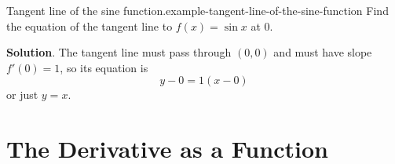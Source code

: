 \documentclass[10pt,]{book}
\numberwithin{equation}{section}
\begin{document}
\begin{example}{Tangent line of the sine function.}{example-tangent-line-of-the-sine-function}%
\hypertarget{p-98}{}%
Find the equation of the tangent line to \(f(x) = \sin x\) at \(0\).%
\par\smallskip%
\noindent\textbf{Solution}.\hypertarget{solution-21}{}\quad%
\hypertarget{p-99}{}%
The tangent line must pass through \((0,0)\) and must have slope \(f'(0) = 1\), so its equation is%
\begin{equation*}
y-0 = 1(x-0)
\end{equation*}
or just \(y=x\).%
\end{example}
%
%
\typeout{************************************************}
\typeout{************************************************}
%
\section[{The Derivative as a Function}]{The Derivative as a Function}\label{section-the-derivative-as-a-function}
%
%
\typeout{************************************************}
\typeout{************************************************}
%
\end{document}
